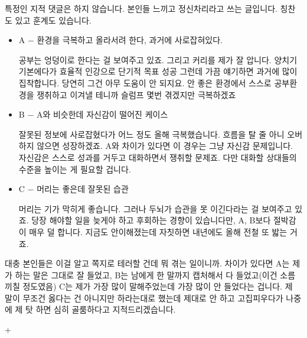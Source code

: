 \vspace{5mm}

특정인 지적 댓글은 하지 않습니다. 본인들 느끼고 정신차리라고 쓰는 글입니다. 칭찬도 있고 훈계도 있습니다.
\vspace{5mm}

\begin{itemize}
    \item A $-$ 환경을 극복하고 올라서려 한다, 과거에 사로잡혀있다.
    \vspace{5mm}

    공부는 엉덩이로 한다는 걸 보여주고 있죠. 그리고 커리를 제가 잘 압니다. 양치기 기본에다가 효율적 인강으로 단기적 목표 성공
    그런데 가끔 얘기하면 과거에 많이 집착합니다. 당연히 그건 아무 도움이 안 되지요.
    안 좋은 환경에서 스스로 공부환경을 쟁취하고 이겨낼 테니까 슬럼프 몇번 겪겠지만 극복하겠죠
    \vspace{5mm}
    
    \item B $-$ A와 비슷한데 자신감이 떨어진 케이스
    \vspace{5mm}
    
    잘못된 정보에 사로잡혔다가 어느 정도 올해 극복했습니다. 흐름을 탈 줄 아니 오버하지 않으면 성장하겠죠.
    A와 차이가 있다면 이 경우는 그냥 자신감 문제입니다. 자신감은 스스로 성과를 거두고 대화하면서 쟁취할 문제죠.
    다만 대화할 상대들의 수준을 높이는 게 필요할 겁니다.
    \vspace{5mm}
    
    \item C $-$ 머리는 좋은데 잘못된 습관
    \vspace{5mm}
    
    머리는 기가 막히게 좋습니다. 그러나 두뇌가 습관을 못 이긴다라는 걸 보여주고 있죠.
    당장 해야할 일을 늦게야 하고 후회하는 경향이 있습니다만, A, B보다 절박감이 매우 덜 합니다.
    지금도 안이해졌는데 자칫하면 내년에도 올해 전철 또 밟는 거죠.
    \vspace{5mm}
    
\end{itemize}
대충 본인들은 이걸 알고 쪽지로 테러할 건데 뭐 겪는 일이니까.
차이가 있다면 A는 제가 하는 말은 그대로 잘 들었고, B는 남에게 한 말까지 캡처해서 다 들었고(이건 소름끼칠 정도였음)
C는 제가 가장 많이 말해주었는데 가장 많이 안 들었다는 겁니다.
제 말이 무조건 옳다는 건 아니지만 하라는대로 했는데 제대로 안 하고 고집피우다가 나중에 제 탓 하면 심히 골룸하다고 지적드리겠습니다.
\vspace{5mm}

+
\vspace{5mm}

